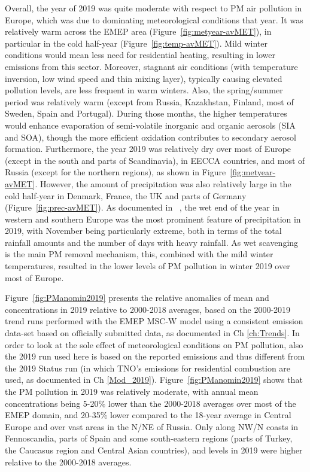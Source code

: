Overall, the year of 2019 was quite moderate with respect to PM air pollution in Europe, which was due to dominating meteorological conditions that year. It was relatively warm across the EMEP area (Figure~\ref{fig:metyear-avMET}), in particular in the cold half-year (Figure~\ref{fig:temp-avMET}). Mild winter conditions would mean less need for residential heating, resulting in lower emissions from this sector. Moreover, stagnant air conditions (with temperature inversion, low wind speed and thin mixing layer), typically causing elevated pollution levels, are less frequent in warm winters. Also, the spring/summer period was relatively warm (except from Russia, Kazakhstan, Finland, most of Sweden, Spain and Portugal). During those months, the higher temperatures would enhance evaporation of semi-volatile inorganic and organic aerosols (SIA and SOA), though the more efficient oxidation contributes to secondary aerosol formation. Furthermore, the year 2019 was relatively dry over most of Europe (except in the south and parts of Scandinavia), in EECCA countries, and most of Russia (except for the northern regions), as shown in Figure~\ref{fig:metyear-avMET}. However, the amount of precipitation was also relatively large in the cold half-year in Denmark, France, the UK and parts of Germany (Figure~\ref{fig:prec-avMET}). As documented in ~\citet{CAMS2020}, the wet end of the year in western and southern Europe was the most prominent feature of precipitation in 2019, with 
November being particularly extreme, both in terms of the total rainfall amounts and the number of days with heavy rainfall. As wet scavenging is the main PM removal mechanism, this, combined with the mild winter temperatures, resulted in the lower levels of PM pollution in winter 2019 over most of Europe.   

Figure~\ref{fig:PManomin2019} presents the relative anomalies of mean \PM[10] and \PM[2.5] concentrations in 2019 relative to 2000-2018 averages, based on the 2000-2019 trend runs performed with the EMEP MSC-W model using a consistent emission data-set based on officially submitted data, as documented in Ch \ref{ch:Trends}. In order to look at the sole effect of meteorological conditions on PM pollution, also the 2019 run used here is based on the reported emissions and thus different from the 2019 Status run (in which TNO's emissions for residential combustion are used, as documented in Ch \ref{Mod_2019}). Figure~\ref{fig:PManomin2019} shows that the PM pollution in 2019 was relatively moderate, with annual mean concentrations being 5-20\% lower than the 2000-2018 averages over most of the EMEP domain, and 20-35\% lower compared to the 18-year average in Central Europe and over vast areas in the N/NE of Russia. Only along NW/N coasts in Fennoscandia, parts of Spain and some south-eastern regions (parts of Turkey, the Caucasus region and Central Asian countries), \PM[10] and \PM[2.5] levels in 2019 were higher relative to the 2000-2018 averages. 

